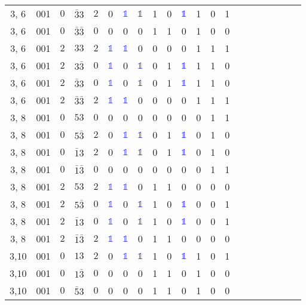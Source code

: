 \begin{longtable*}{c| cccccccccccccccccccc }
3, 6& 001& $0$& $\bar{3}3$& $2$& 0& \textcolor{blue}{$\mathds{1}$}& \textcolor{blue}{$\mathds{1}$}& 1& 0& \textcolor{blue}{$\mathds{1}$}& 1& 0& 1\\
3, 6& 001& $0$& $\bar{3}\bar{3}$& $0$& 0& 0& 0& 1& 1& 0& 1& 0& 0\\
3, 6& 001& $2$& $33$& $2$& \textcolor{blue}{$\mathds{1}$}& \textcolor{blue}{$\mathds{1}$}& 0& 0& 0& 0& 1& 1& 1\\
3, 6& 001& $2$& $3\bar{3}$& $0$& \textcolor{blue}{$\mathds{1}$}& 0& \textcolor{blue}{$\mathds{1}$}& 0& 1& \textcolor{blue}{$\mathds{1}$}& 1& 1& 0\\
3, 6& 001& $2$& $\bar{3}3$& $0$& \textcolor{blue}{$\mathds{1}$}& 0& \textcolor{blue}{$\mathds{1}$}& 0& 1& \textcolor{blue}{$\mathds{1}$}& 1& 1& 0\\
3, 6& 001& $2$& $\bar{3}\bar{3}$& $2$& \textcolor{blue}{$\mathds{1}$}& \textcolor{blue}{$\mathds{1}$}& 0& 0& 0& 0& 1& 1& 1\\
3, 8& 001& $0$& $53$& $0$& 0& 0& 0& 0& 0& 0& 0& 1& 1\\
3, 8& 001& $0$& $5\bar{3}$& $2$& 0& \textcolor{blue}{$\mathds{1}$}& \textcolor{blue}{$\mathds{1}$}& 0& 1& \textcolor{blue}{$\mathds{1}$}& 0& 1& 0\\
3, 8& 001& $0$& $\bar{1}3$& $2$& 0& \textcolor{blue}{$\mathds{1}$}& \textcolor{blue}{$\mathds{1}$}& 0& 1& \textcolor{blue}{$\mathds{1}$}& 0& 1& 0\\
3, 8& 001& $0$& $\bar{1}\bar{3}$& $0$& 0& 0& 0& 0& 0& 0& 0& 1& 1\\
3, 8& 001& $2$& $53$& $2$& \textcolor{blue}{$\mathds{1}$}& \textcolor{blue}{$\mathds{1}$}& 0& 1& 1& 0& 0& 0& 0\\
3, 8& 001& $2$& $5\bar{3}$& $0$& \textcolor{blue}{$\mathds{1}$}& 0& \textcolor{blue}{$\mathds{1}$}& 1& 0& \textcolor{blue}{$\mathds{1}$}& 0& 0& 1\\
3, 8& 001& $2$& $\bar{1}3$& $0$& \textcolor{blue}{$\mathds{1}$}& 0& \textcolor{blue}{$\mathds{1}$}& 1& 0& \textcolor{blue}{$\mathds{1}$}& 0& 0& 1\\
3, 8& 001& $2$& $\bar{1}\bar{3}$& $2$& \textcolor{blue}{$\mathds{1}$}& \textcolor{blue}{$\mathds{1}$}& 0& 1& 1& 0& 0& 0& 0\\
3,10& 001& $0$& $13$& $2$& 0& \textcolor{blue}{$\mathds{1}$}& \textcolor{blue}{$\mathds{1}$}& 1& 0& \textcolor{blue}{$\mathds{1}$}& 1& 0& 1\\
3,10& 001& $0$& $1\bar{3}$& $0$& 0& 0& 0& 1& 1& 0& 1& 0& 0\\
3,10& 001& $0$& $\bar{5}3$& $0$& 0& 0& 0& 1& 1& 0& 1& 0& 0\\

\end{longtable*}
